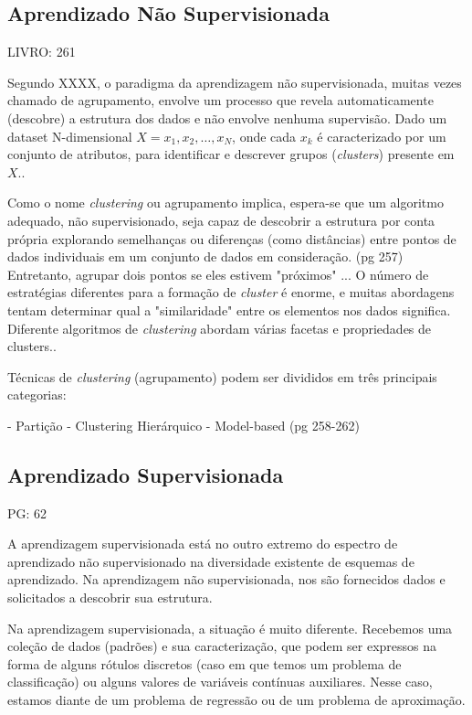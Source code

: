 \subsection{Aprendizado Não Supervisionada}
LIVRO: 261

Segundo XXXX, o paradigma da aprendizagem não supervisionada, muitas vezes chamado de agrupamento, envolve um processo que revela automaticamente (descobre) a estrutura dos dados e não envolve nenhuma supervisão. Dado um dataset N-dimensional $X={x_1,x_2,\dots,x_N}$, onde cada $x_k$ é caracterizado por um conjunto de atributos, para identificar e descrever grupos (\textit{clusters}) presente em $X$..


Como o nome \textit{clustering} ou agrupamento implica, espera-se que um algoritmo adequado, não supervisionado, seja capaz de descobrir a estrutura por conta própria explorando semelhanças ou diferenças (como distâncias) entre pontos de dados individuais em um conjunto de dados em consideração. (pg 257) Entretanto, agrupar dois pontos se eles estivem "próximos" ... O número de estratégias diferentes para a formação de \textit{cluster} é enorme, e muitas abordagens tentam determinar qual a "similaridade" entre os elementos nos dados significa. Diferente algoritmos de \textit{clustering} abordam várias facetas e propriedades de clusters..


Técnicas de \textit{clustering} (agrupamento) podem ser divididos em três principais categorias:

- Partição 
- Clustering Hierárquico 
- Model-based (pg 258-262)


\subsection{Aprendizado Supervisionada}

PG: 62


A aprendizagem supervisionada está no outro extremo do espectro de aprendizado não supervisionado na diversidade existente de esquemas de aprendizado. Na aprendizagem não supervisionada, nos são fornecidos dados e solicitados a descobrir sua estrutura.

Na aprendizagem supervisionada, a situação é muito diferente. Recebemos uma coleção de dados (padrões) e sua caracterização, que podem ser expressos na forma de alguns rótulos discretos (caso em que temos um problema de classificação) ou alguns valores de variáveis contínuas auxiliares. Nesse caso, estamos diante de um problema de regressão ou de um problema de aproximação.

